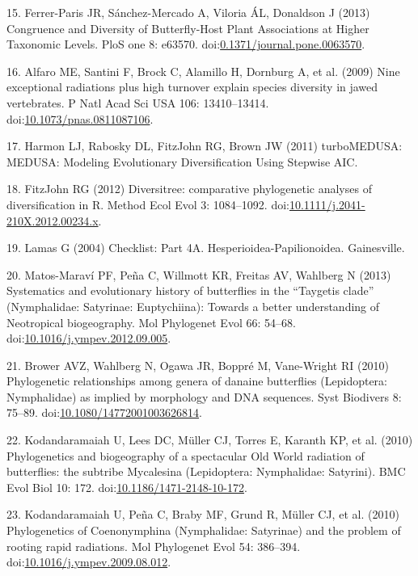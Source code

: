 \documentclass[10pt]{article}
\begin{document}
15. Ferrer-Paris JR, S{á}nchez-Mercado A, Viloria ÁL, Donaldson J (2013)
Congruence and Diversity of Butterfly-Host Plant Associations at Higher
Taxonomic Levels. PloS one 8: e63570.
doi:\href{http://dx.doi.org/0.1371/journal.pone.0063570}{0.1371/journal.pone.0063570}.

16. Alfaro ME, Santini F, Brock C, Alamillo H, Dornburg A, et al. (2009)
Nine exceptional radiations plus high turnover explain species diversity
in jawed vertebrates. P Natl Acad Sci USA 106: 13410--13414.
doi:\href{http://dx.doi.org/10.1073/pnas.0811087106}{10.1073/pnas.0811087106}.

17. Harmon LJ, Rabosky DL, {FitzJohn} RG, Brown JW (2011) turboMEDUSA:
MEDUSA: Modeling Evolutionary Diversification Using Stepwise AIC.

18. {FitzJohn} RG (2012) Diversitree: comparative phylogenetic analyses
of diversification in R. Method Ecol Evol 3: 1084--1092.
doi:\href{http://dx.doi.org/10.1111/j.2041-210X.2012.00234.x}{10.1111/j.2041-210X.2012.00234.x}.

19. Lamas G (2004) Checklist: Part 4A. Hesperioidea-Papilionoidea.
Gainesville.

20. Matos-Maraví PF, Peña C, Willmott KR, Freitas AV, Wahlberg N (2013)
Systematics and evolutionary history of butterflies in the ``Taygetis
clade'' (Nymphalidae: Satyrinae: Euptychiina): Towards a better
understanding of Neotropical biogeography. Mol Phylogenet Evol 66:
54--68.
doi:\href{http://dx.doi.org/10.1016/j.ympev.2012.09.005}{10.1016/j.ympev.2012.09.005}.

21. Brower AVZ, Wahlberg N, Ogawa JR, Boppré M, Vane-Wright RI (2010)
Phylogenetic relationships among genera of danaine butterflies
(Lepidoptera: Nymphalidae) as implied by morphology and DNA sequences.
Syst Biodivers 8: 75--89.
doi:\href{http://dx.doi.org/10.1080/14772001003626814}{10.1080/14772001003626814}.

22. Kodandaramaiah U, Lees DC, Müller CJ, Torres E, Karanth KP, et al.
(2010) Phylogenetics and biogeography of a spectacular Old World
radiation of butterflies: the subtribe Mycalesina (Lepidoptera:
Nymphalidae: Satyrini). BMC Evol Biol 10: 172.
doi:\href{http://dx.doi.org/10.1186/1471-2148-10-172}{10.1186/1471-2148-10-172}.

23. Kodandaramaiah U, Peña C, Braby MF, Grund R, Müller CJ, et al.
(2010) Phylogenetics of Coenonymphina (Nymphalidae: Satyrinae) and the
problem of rooting rapid radiations. Mol Phylogenet Evol 54: 386--394.
doi:\href{http://dx.doi.org/10.1016/j.ympev.2009.08.012}{10.1016/j.ympev.2009.08.012}.
\end{document}
